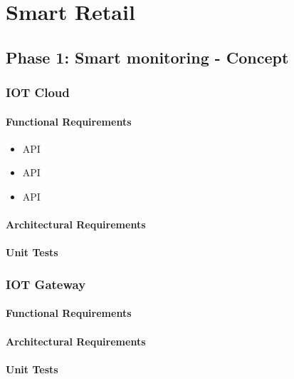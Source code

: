\documentclass[pdftex,10pt,a4paper]{report}
\begin{document}
\newpage


\newpage
{}

\tableofcontents 

\newpage
{}

\begingroup
\renewcommand{\cleardoublepage}{}
\renewcommand{\clearpage}{}
	\chapter{Smart Retail}		
		\section{Phase 1: Smart monitoring - Concept}
			\subsection{IOT Cloud}			
				\subsubsection{Functional Requirements}
					\begin{itemize}
						\item API
						\item API
						\item API
					\end{itemize}
				\subsubsection{Architectural Requirements}
				\subsubsection{Unit Tests}
			\subsection{IOT Gateway}
				\subsubsection{Functional Requirements}
				\subsubsection{Architectural Requirements}
				\subsubsection{Unit Tests}
\end{document}

